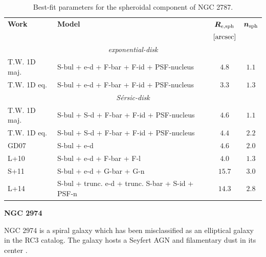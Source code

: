 \documentclass[preprint2]{emulateapj}
\begin{document}
  \begin{table}[h]
  \small
  \caption{Best-fit parameters for the spheroidal component of NGC 2787.}
  \begin{center}
  \begin{tabular}{llcc}
  \hline
  {\bf Work} & {\bf Model}   & $\bm R_{\rm e,sph}$    & $\bm n_{\rm sph}$ \\
    &  &  $[\rm arcsec]$ & \\
  \hline
  \multicolumn{4}{c}{\emph{exponential-disk}} \\
  T.W. 1D maj. & S-bul + e-d + F-bar + F-id + PSF-nucleus & $4.8$  &  $1.1$ \\
  T.W. 1D eq.  & S-bul + e-d + F-bar + F-id + PSF-nucleus & $3.3$  &  $1.3$ \\
  \hline
  \multicolumn{4}{c}{\emph{S\'ersic-disk}}\\
  T.W. 1D maj. & S-bul + S-d + F-bar + F-id + PSF-nucleus & $4.6$  &  $1.1$ \\
  T.W. 1D eq.  & S-bul + S-d + F-bar + F-id + PSF-nucleus & $4.4$  &  $2.2$ \\
  \hline
  GD07         & S-bul + e-d					  & $4.6$   &  $2.0$ \\
  L+10         & S-bul + e-d + F-bar + F-l			  & $4.0$   &  $1.3$ \\
  S+11         & S-bul + e-d + G-bar + G-n			  & $15.7$  &  $3.0$ \\
  L+14         & S-bul + trunc. e-d + trunc. S-bar + S-id + PSF-n & $14.3$  &  $2.8$ \\
  \hline
  \end{tabular}
  \end{center}
  \label{tab:n2787}
  \end{table}



  \clearpage\newpage\noindent
  {\bf NGC 2974 \\}

  NGC 2974 is a spiral galaxy which has been misclassified as an elliptical galaxy in the RC3 catalog.
  The galaxy hosts a Seyfert AGN \citep{veroncettyveron2006} and filamentary dust in its center \citep{tran2001}.
   
\end{document}
